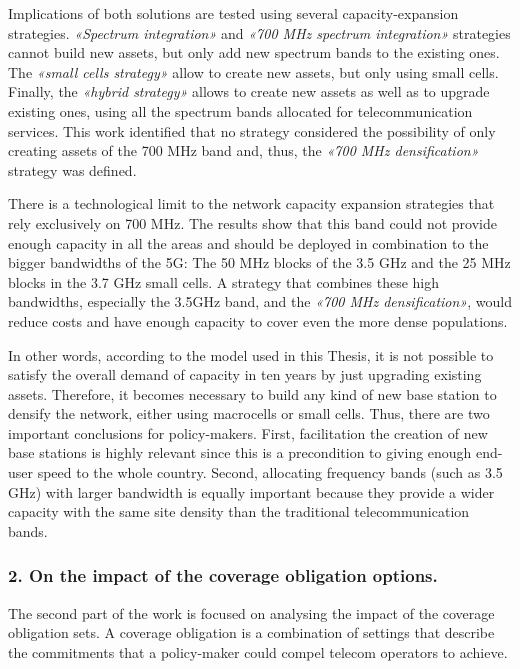 Implications of both solutions are tested using several capacity-expansion strategies. \textit{«Spectrum integration»} and \textit{«700 MHz spectrum integration»} strategies cannot build new assets, but only add new spectrum bands to the existing ones. The \textit{«small cells strategy»} allow to create new assets, but only using small cells. Finally, the \textit{«hybrid strategy»} allows to create new assets as well as to upgrade existing ones, using all the spectrum bands allocated for telecommunication services. This work identified that no strategy considered the possibility of only creating assets of the 700 MHz band and, thus, the \textit{«700 MHz densification»} strategy was defined. \par

There is a technological limit to the network capacity expansion strategies that rely exclusively on 700 MHz. The results show that this band could not provide enough capacity in all the areas and should be deployed in combination to the bigger bandwidths of the 5G: The 50 MHz blocks of the 3.5 GHz and the 25 MHz blocks in the 3.7 GHz small cells. A strategy that combines these high bandwidths, especially the 3.5GHz band, and the \textit{«700 MHz densification»}, would reduce costs and have enough capacity to cover even the more dense populations. \par

In other words, according to the model used in this Thesis, it is not possible to satisfy the overall demand of capacity in ten years by just upgrading existing assets. Therefore, it becomes necessary to build any kind of new base station to densify the network, either using macrocells or small cells. Thus, there are two important conclusions for policy-makers. First, facilitation the creation of new base stations is highly relevant since this is a precondition to giving enough end-user speed to the whole country. Second, allocating frequency bands (such as 3.5 GHz) with larger bandwidth is equally important because they provide a wider capacity with the same site density than the traditional telecommunication bands.\par








\subsubsection*{2. On the impact of the coverage obligation options.}
The second part of the work is focused on analysing the impact of the coverage obligation sets. A coverage obligation is a combination of settings that describe the commitments that a policy-maker could compel telecom operators to achieve.\par

